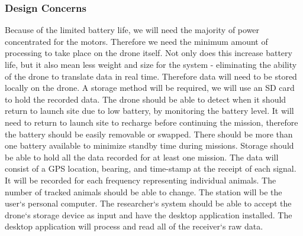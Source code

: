 \documentclass[onecolumn, draftclsnofoot,10pt, compsoc]{IEEEtran}
\begin{document}
\subsubsection{Design Concerns}
Because of the limited battery life, we will need the majority of power concentrated for the motors. Therefore we need the minimum amount of processing to take place on the drone itself. Not only does this increase battery life, but it also mean less weight and size for the system - eliminating the ability of the drone to translate data in real time. Therefore data will need to be stored locally on the drone. A storage method will be required, we will use an SD card to hold the recorded data.
\newline
\newline
The drone should be able to detect when it should return to launch site due to low battery, by monitoring the battery level.
It will need to return to launch site to recharge before continuing the mission, therefore the battery should be easily removable or swapped.
There should be more than one battery available to minimize standby time during missions.
\newline
\newline
Storage should be able to hold all the data recorded for at least one mission.
The data will consist of a GPS location, bearing, and time-stamp at the receipt of each signal. It will be recorded for each frequency representing individual animals. The number of tracked animals should be able to change.
\newline
\newline
The station will be the user`s personal computer. The researcher`s system should be able to accept the drone`s storage device as input and have the desktop application installed.
The desktop application will process and read all of the receiver`s raw data.  
\end{document}
